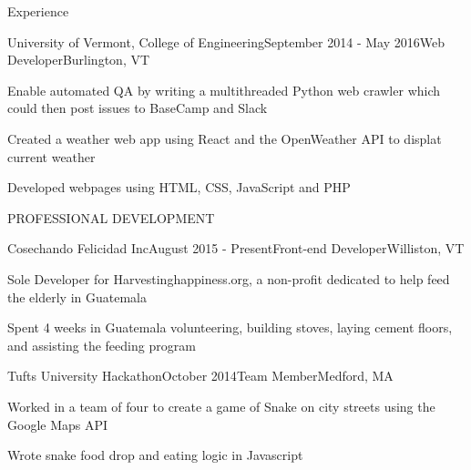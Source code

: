 \documentclass{resume} %
\begin{document}
\begin{rSection}{Experience}
\begin{rSubsection}{University of Vermont, College of Engineering}{September 2014 - May 2016}{Web Developer}{Burlington, VT}
\item Enable automated QA by writing a multithreaded Python web crawler which could then post issues to BaseCamp and Slack
\item Created a weather web app using React and the OpenWeather API to displat current weather 
\item Developed webpages using HTML, CSS, JavaScript and PHP 

\end{rSubsection}

\end{rSection}


\begin{rSection}{PROFESSIONAL DEVELOPMENT}

\begin{rSubsection}{Cosechando Felicidad Inc}{August 2015 - Present}{Front-end Developer}{Williston, VT}

\item Sole Developer for Harvestinghappiness.org, a non-profit dedicated to help feed the elderly in Guatemala
\item Spent 4 weeks in Guatemala volunteering, building stoves, laying cement floors, and assisting the feeding program

\end{rSubsection}


\begin{rSubsection}{Tufts University Hackathon}{October 2014}{Team Member}{Medford, MA}

\item Worked in a team of four to create a game of Snake on city streets using the Google Maps API
\item Wrote snake food drop and eating logic in Javascript

\end{rSubsection}

\end{rSection}

\end{document}
